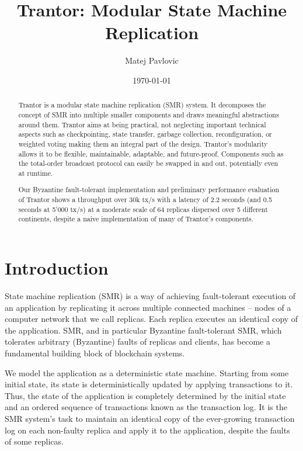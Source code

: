 \documentclass{article}
\title{Trantor: Modular State Machine Replication}
\author{Matej Pavlovic}
\date{\today}
\begin{document}
\maketitle

\begin{abstract}
Trantor is a modular state machine replication (SMR) system.
It decomposes the concept of SMR into multiple smaller components and draws meaningful abstractions around them.
Trantor aims at being practical, not neglecting important technical aspects
such as checkpointing, state transfer, garbage collection, reconfiguration, or weighted voting making them an integral part of the design.
Trantor's modularity allows it to be flexible, maintainable, adaptable, and future-proof.
Components such as the total-order broadcast protocol can easily be swapped in and out, potentially even at runtime.

Our Byzantine fault-tolerant implementation and preliminary performance evaluation of Trantor
shows a throughput over 30k tx/s with a latency of 2.2 seconds (and 0.5 seconds at 5'000 tx/s)
at a moderate scale of 64 replicas dispersed over 5 different continents,
despite a naive implementation of many of Trantor's components.

\end{abstract}

\section{Introduction}

State machine replication (SMR) is a way of achieving fault-tolerant execution of an application
by replicating it across multiple connected machines – nodes of a computer network that we call replicas.
Each replica executes an identical copy of the application.
SMR, and in particular Byzantine fault-tolerant SMR,
which tolerates arbitrary (Byzantine) faults of replicas and clients,
has become a fundamental building block of blockchain systems.

We model the application as a deterministic state machine.
Starting from some initial state, its state is deterministically updated by applying transactions to it.
Thus, the state of the application is completely determined by the initial state and an ordered sequence of transactions known as the transaction log.
It is the SMR system’s task to maintain an identical copy of the ever-growing transaction log on each non-faulty replica
and apply it to the application, despite the faults of some replicas.
\end{document}
